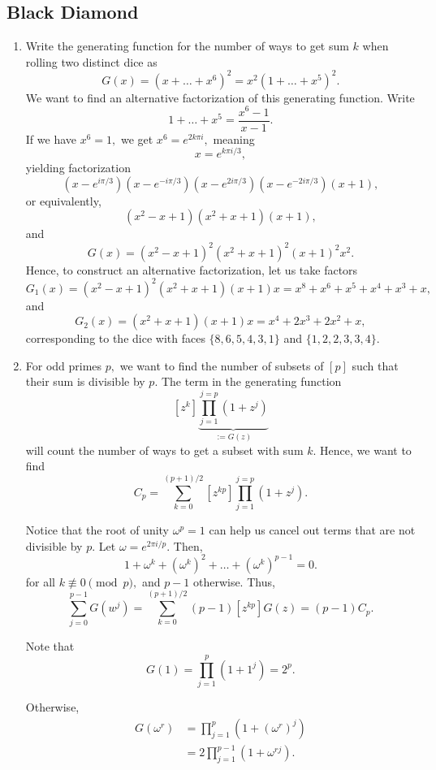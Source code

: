 \documentclass[12pt]{article}
\begin{document}
\subsection{Black Diamond}
\begin{enumerate}
  \item [10] Write the generating function for the number of ways to
    get sum $k$ when rolling two distinct dice as
    $$
    G(x) = (x + \ldots +x ^6)^2 = x^2 (1 + \ldots + x^5)^2.
    $$
    We want to find an alternative factorization of this generating
    function. Write
    $$
    1 + \ldots + x^5 = \dfrac{x^6 - 1}{x - 1}.
    $$
    If we have $x^6 = 1,$ we get $x^6 = e^{2k\pi i},$ meaning
    $$
    x = e^{k\pi i/3},
    $$
    yielding factorization
    $$
    (x - e^{i\pi/3}) (x - e^{-i\pi/3}) (x - e^{2i\pi/3})(x -
    e^{-2i\pi/3}) (x + 1),
    $$
    or equivalently,
    $$
    (x^2 - x + 1)(x^2 + x +1)(x + 1),
    $$
    and $$
    G(x) = (x^2 - x + 1)^2 (x^2 + x+1)^2 (x+1)^2 x^2.
    $$
    Hence, to construct an alternative factorization, let us take factors
    $$
    G_1(x) = (x^2 - x+ 1)^2(x^2 + x+ 1) (x+1) x = x^8 + x^6 + x^5 +
    x^4 + x^3 + x,
    $$
    and $$
    G_2(x) = (x^2 + x+ 1)(x+1)x = x^4 + 2x^3 + 2x^2 + x,
    $$
    corresponding to the dice with faces $\{8,6, 5, 4, 3, 1\}$ and
    $\{1, 2, 2, 3, 3, 4\}.$

  \item [12] For odd primes $p,$ we want to find the number of
    subsets of $[p]$ such that their sum is divisible by $p.$ The
    term in the generating function
    $$
    [z^k]\underbrace{\prod_{j = 1}^{j = p} (1  + z^{j})}_{:=G(z)}
    $$
    will count the number of ways to get a subset with sum $k.$
    Hence, we want to find
    $$
    C_p = \sum_{k = 0}^{(p + 1) / 2} [z^{kp}] \prod_{j = 1}^{j = p} (1 + z^j).
    $$

    Notice that the root of unity $\omega^{p} = 1$ can help us cancel
    out terms that are not divisible by $p.$ Let $\omega = e^{2\pi i /p}.$ Then,
    $$
    1 + \omega^k + (\omega^k)^2 + \ldots + (\omega^k)^{p - 1} = 0.
    $$
    for all $k \not \equiv 0 \pmod p,$ and $p - 1$ otherwise. Thus,
    $$
    \sum_{j = 0}^{p-1}G(w^j) = \sum_{k = 0}^{(p + 1)/2} (p-1)[z^{kp}]
    G(z) = (p-1)C_p.
    $$

    Note that
    $$
    G(1) = \prod_{j = 1}^{p} (1+1^j) = 2^p.
    $$

    Otherwise,
    \begin{align*}
      G(\omega^r) &= \prod_{j = 1}^{p}(1 + (\omega^r)^j) \\
      &= 2 \prod_{j = 1}^{p-1} (1 + \omega^{rj}).
    \end{align*}


\end{enumerate}
\end{document}
